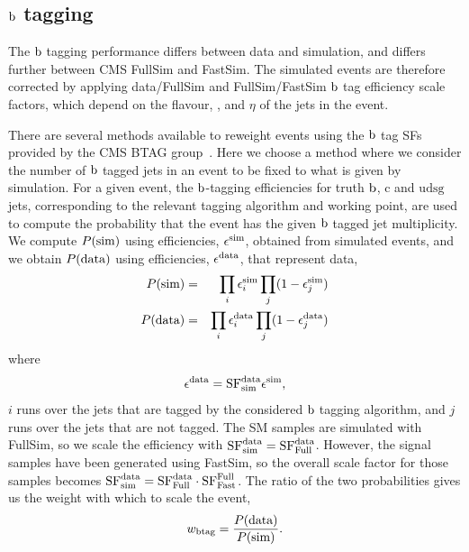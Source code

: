 \subsection{\texorpdfstring{$\mathrm{b}$}{b} tagging \label{sec:boost_btag_sf}} 

The $\mathrm{b}$ tagging performance differs between data and simulation, and differs further between 
CMS FullSim and FastSim.  
The simulated events are therefore corrected by applying data/FullSim and FullSim/FastSim $\mathrm{b}$
tag efficiency scale factors, which depend on the flavour, \pt, and $\eta$ of the jets in the
event. 

There are several methods available to reweight events using the $\mathrm{b}$ tag SFs provided by the CMS
BTAG group~\cite{BTagSF1}. 
Here we choose a method where we consider the number of $\mathrm{b}$ tagged jets in an event to be fixed
to what is given by simulation.  
For a given event, the $\mathrm{b}$-tagging efficiencies for truth $\mathrm{b}$, $\mathrm{c}$ and
$\mathrm{udsg}$ jets, corresponding to the relevant tagging algorithm and working point, are used to
compute the probability that the event has the given $\mathrm{b}$ tagged jet multiplicity. 
We compute $P({\rm sim})$ using efficiencies, $\epsilon^{\rm sim}$, obtained from simulated events,
and we obtain $P(\rm data)$ using efficiencies, $\epsilon^{\rm data}$, that represent data,
\begin{eqnarray}
P(\rm sim) & = & \prod_{i} \epsilon_i^{\rm sim} \prod_{j} (1 - \epsilon_j^{\rm sim}) \\
P(\rm data) & = & \prod_{i} \epsilon_i^{\rm data} \prod_{j} (1 - \epsilon_j^{\rm data})
\end{eqnarray}
where
\begin{equation}
\epsilon^{\rm data} = {\rm SF}^{\rm data}_{\rm sim} \epsilon^{\rm sim} ,
\end{equation}
$i$ runs over the jets that are tagged by the considered $\mathrm{b}$ tagging algorithm, and $j$
runs over the jets that are not tagged.
The SM samples are simulated with FullSim, so we scale the efficiency with ${\rm SF}^{\rm
data}_{\rm sim} = {\rm SF}^{\rm data}_{\rm Full}$.  
However, the signal samples have been generated using FastSim, so the overall scale factor for
those samples becomes 
${\rm SF}^{\rm data}_{\rm  sim} = {\rm SF}^{\rm data}_{\rm Full} \cdot {\rm SF}^{\rm Full}_{\rm
Fast}$.
The ratio of the two probabilities gives us the weight with which to scale the event,
\begin{equation}
w_{\rm btag} = \frac{P(\rm data)}{P(\rm sim)} .
\end{equation}

